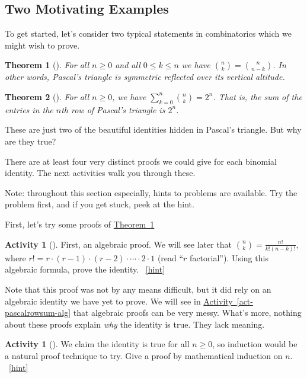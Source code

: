 \documentclass[10pt,]{book}
\theoremstyle{plain}
\newtheorem{theorem}{Theorem}[section]
\theoremstyle{definition}
\theoremstyle{definition}
\theoremstyle{definition}
\newtheorem{activity}[project]{Activity}
\numberwithin{equation}{chapter}
\begin{document}
\subsection[{Two Motivating Examples}]{Two Motivating Examples}\label{subsec-basic-proofs-examples}
\hypertarget{p-90}{}%
To get started, let's consider two typical statements in combinatorics which we might wish to prove.%
\begin{theorem}[{}]\label{thm-pascalsym}
\hypertarget{p-91}{}%
For all \(n \ge 0\) and all \(0 \le k \le n\) we have \(\binom{n}{k} = \binom{n}{n-k}\).  In other words, Pascal's triangle is symmetric reflected over its vertical altitude.%
\end{theorem}
\begin{theorem}[{}]\label{thm-pascalrowsum}
\hypertarget{p-92}{}%
For all \(n \ge 0\), we have \(\sum_{k=0}^n \binom{n}{k} = 2^n\).  That is, the sum of the entries in the \(n\)th row of Pascal's triangle is \(2^n\).%
\end{theorem}
\hypertarget{p-93}{}%
These are just two of the beautiful identities hidden in Pascal's triangle.  But why are they true?%
\par
\hypertarget{p-94}{}%
There are at least four very distinct proofs we could give for each binomial identity.  The next activities walk you through these.%
\par
\hypertarget{p-95}{}%
Note: throughout this section especially, hints to problems are available.  Try the problem first, and if you get stuck, peek at the hint.%
\par
\hypertarget{p-96}{}%
First, let's try some proofs of \hyperref[thm-pascalsym]{Theorem~\ref{thm-pascalsym}}%
\begin{activity}[]\label{activity-10}
\hypertarget{p-97}{}%
First, an algebraic proof.  We will see later that \(\binom{n}{k} = \frac{n!}{k!(n-k)!}\), where \(r! = r \cdot (r-1) \cdot (r-2) \cdot\cdots\cdot 2\cdot 1\) (read ``\(r\) factorial'').  Using this algebraic formula, prove the identity.%
~\hfill{\tiny\hyperlink{a-10}{[hint]}\hypertarget{q-10}{}}\end{activity}
\hypertarget{p-100}{}%
Note that this proof was not by any means difficult, but it did rely on an algebraic identity we have yet to prove.  We will see in \hyperref[act-pascalrowsum-alg]{Activity~\ref{act-pascalrowsum-alg}} that algebraic proofs can be very messy.  What's more, nothing about these proofs explain \emph{why} the identity is true.  They lack meaning.%
\begin{activity}[]\label{activity-11}
\hypertarget{p-101}{}%
We claim the identity is true for all \(n \ge 0\), so induction would be a natural proof technique to try.  Give a proof by mathematical induction on \(n\).%
~\hfill{\tiny\hyperlink{a-11}{[hint]}\hypertarget{q-11}{}}\end{activity}
\end{document}
